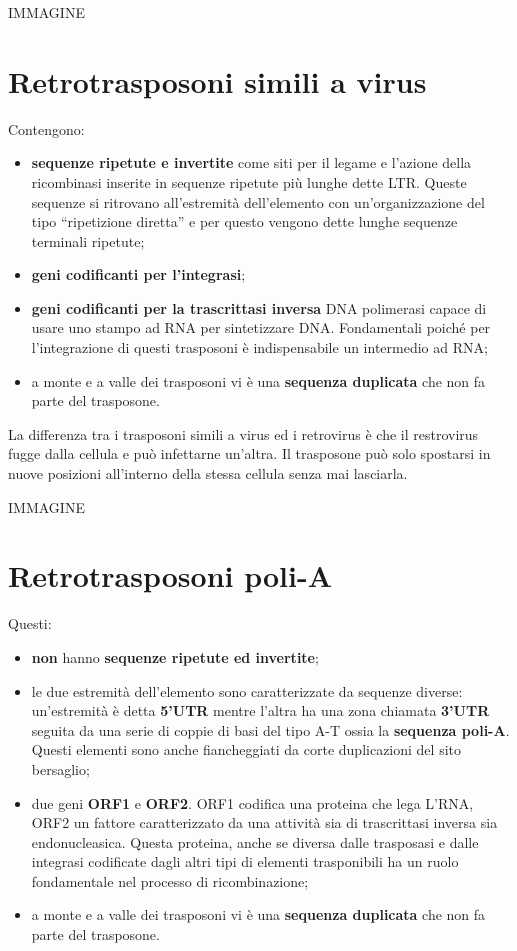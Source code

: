 \documentclass[11pt]{book}
\begin{document}
IMMAGINE

\section{Retrotrasposoni simili a
virus}\label{retrotrasposoni-simili-a-virus}

Contengono:

\begin{itemize}
\itemsep1pt\parskip0pt
\item
  \textbf{sequenze ripetute e invertite} come siti per il legame e
  l'azione della ricombinasi inserite in sequenze ripetute più lunghe
  dette LTR. Queste sequenze si ritrovano all'estremità dell'elemento
  con un'organizzazione del tipo ``ripetizione diretta'' e per questo
  vengono dette lunghe sequenze terminali ripetute;
\item
  \textbf{geni codificanti per l'integrasi};
\item
  \textbf{geni codificanti per la trascrittasi inversa} DNA polimerasi
  capace di usare uno stampo ad RNA per sintetizzare DNA. Fondamentali
  poiché per l'integrazione di questi trasposoni è indispensabile un
  intermedio ad RNA;
\item
  a monte e a valle dei trasposoni vi è una \textbf{sequenza duplicata}
  che non fa parte del trasposone.
\end{itemize}

La differenza tra i trasposoni simili a virus ed i retrovirus è che il
restrovirus fugge dalla cellula e può infettarne un'altra. Il trasposone
può solo spostarsi in nuove posizioni all'interno della stessa cellula
senza mai lasciarla.

IMMAGINE

\section{Retrotrasposoni poli-A}\label{retrotrasposoni-poli-a}

Questi:

\begin{itemize}
\itemsep1pt\parskip0pt
\item
  \textbf{non} hanno \textbf{sequenze ripetute ed invertite};
\item
  le due estremità dell'elemento sono caratterizzate da sequenze
  diverse: un'estremità è detta \textbf{5'UTR} mentre l'altra ha una
  zona chiamata \textbf{3'UTR} seguita da una serie di coppie di basi
  del tipo A-T ossia la \textbf{sequenza poli-A}. Questi elementi sono
  anche fiancheggiati da corte duplicazioni del sito bersaglio;
\item
  due geni \textbf{ORF1} e \textbf{ORF2}. ORF1 codifica una proteina che
  lega L'RNA, ORF2 un fattore caratterizzato da una attività sia di
  trascrittasi inversa sia endonucleasica. Questa proteina, anche se
  diversa dalle trasposasi e dalle integrasi codificate dagli altri tipi
  di elementi trasponibili ha un ruolo fondamentale nel processo di
  ricombinazione;
\item
  a monte e a valle dei trasposoni vi è una \textbf{sequenza duplicata}
  che non fa parte del trasposone.
\end{itemize}
\end{document}
